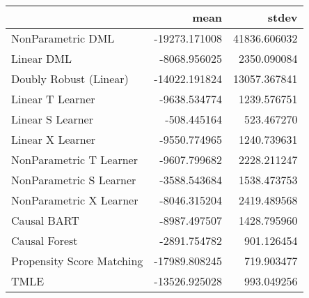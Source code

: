\begin{tabular}{lrr}
\toprule
{} &          mean &         stdev \\
\midrule
NonParametric DML         & -19273.171008 &  41836.606032 \\
Linear DML                &  -8068.956025 &   2350.090084 \\
Doubly Robust (Linear)    & -14022.191824 &  13057.367841 \\
Linear T Learner          &  -9638.534774 &   1239.576751 \\
Linear S Learner          &   -508.445164 &    523.467270 \\
Linear X Learner          &  -9550.774965 &   1240.739631 \\
NonParametric T Learner   &  -9607.799682 &   2228.211247 \\
NonParametric S Learner   &  -3588.543684 &   1538.473753 \\
NonParametric X Learner   &  -8046.315204 &   2419.489568 \\
Causal BART               &  -8987.497507 &   1428.795960 \\
Causal Forest             &  -2891.754782 &    901.126454 \\
Propensity Score Matching & -17989.808245 &    719.903477 \\
TMLE                      & -13526.925028 &    993.049256 \\
\bottomrule
\end{tabular}
